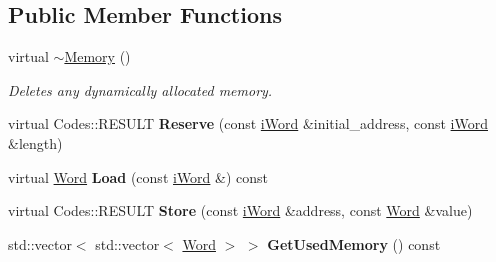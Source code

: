 \subsection*{Public Member Functions}
\begin{DoxyCompactItemize}
\item 
\hypertarget{classMemory_a0ffa9759ebbf103f11132a505b93bdc0}{
virtual \hyperlink{classMemory_a0ffa9759ebbf103f11132a505b93bdc0}{$\sim$Memory} ()}
\label{classMemory_a0ffa9759ebbf103f11132a505b93bdc0}

\begin{DoxyCompactList}\small\item\em Deletes any dynamically allocated memory. \item\end{DoxyCompactList}\item 
\hypertarget{classMemory_a80cd994d4833dde66b8005184e510dda}{
virtual Codes::RESULT {\bfseries Reserve} (const \hyperlink{classiWord}{iWord} \&initial\_\-address, const \hyperlink{classiWord}{iWord} \&length)}
\label{classMemory_a80cd994d4833dde66b8005184e510dda}

\item 
\hypertarget{classMemory_aca021609915080b38ca1b00d9b416e80}{
virtual \hyperlink{classWord}{Word} {\bfseries Load} (const \hyperlink{classiWord}{iWord} \&) const }
\label{classMemory_aca021609915080b38ca1b00d9b416e80}

\item 
\hypertarget{classMemory_a23703464fb24710d09be1b2010e79edc}{
virtual Codes::RESULT {\bfseries Store} (const \hyperlink{classiWord}{iWord} \&address, const \hyperlink{classWord}{Word} \&value)}
\label{classMemory_a23703464fb24710d09be1b2010e79edc}

\item 
\hypertarget{classMemory_a98671c2e4238df99efd56cb26185a17c}{
std::vector$<$ std::vector$<$ \hyperlink{classWord}{Word} $>$ $>$ {\bfseries GetUsedMemory} () const }
\label{classMemory_a98671c2e4238df99efd56cb26185a17c}

\end{DoxyCompactItemize}
